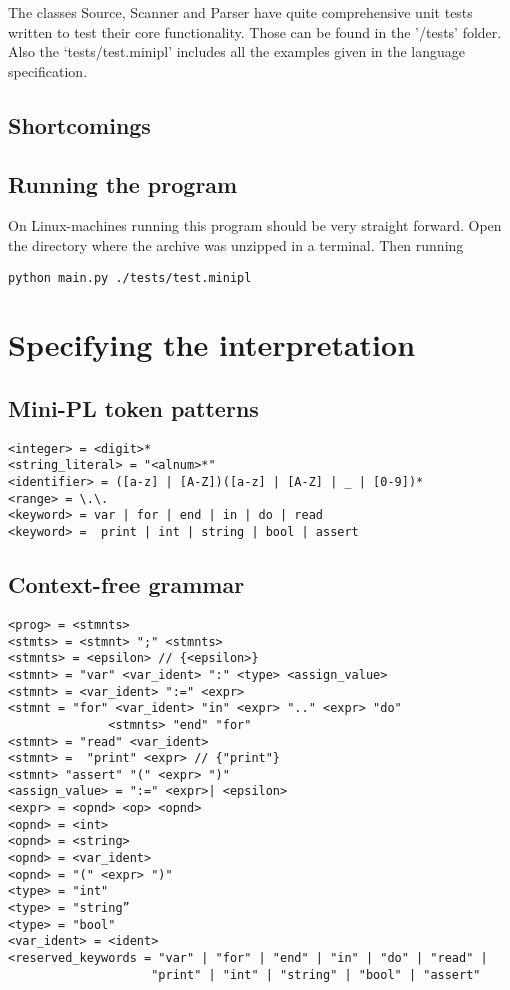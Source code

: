 \documentclass[12pt,a4paper]{article}
\begin{document}
The classes Source, Scanner and Parser have quite comprehensive
unit tests written to test their core functionality. Those
can be found in the '/tests' folder.
Also the `tests/test.minipl' includes all the examples given
in the language specification.

\subsection{Shortcomings}

\subsection{Running the program}

On Linux-machines running this program should be very straight forward.
Open the directory where the archive was unzipped in a terminal.
Then running 
\begin{lstlisting}[language=Sh]
python main.py ./tests/test.minipl
\end{lstlisting}

\section{Specifying the interpretation}

\subsection{Mini-PL token patterns}

\begin{verbatim}
<integer> = <digit>*
<string_literal> = "<alnum>*"
<identifier> = ([a-z] | [A-Z])([a-z] | [A-Z] | _ | [0-9])*
<range> = \.\.
<keyword> = var | for | end | in | do | read 
<keyword> =  print | int | string | bool | assert
\end{verbatim}

\subsection{Context-free grammar}
\begin{verbatim}
<prog> = <stmnts>
<stmts> = <stmnt> ";" <stmnts>
<stmnts> = <epsilon> // {<epsilon>}
<stmnt> = "var" <var_ident> ":" <type> <assign_value>
<stmnt> = <var_ident> ":=" <expr>
<stmnt = "for" <var_ident> "in" <expr> ".." <expr> "do"
              <stmnts> "end" "for"
<stmnt> = "read" <var_ident> 
<stmnt> =  "print" <expr> // {"print"}
<stmnt> "assert" "(" <expr> ")"
<assign_value> = ":=" <expr>| <epsilon>
<expr> = <opnd> <op> <opnd>
<opnd> = <int>
<opnd> = <string>
<opnd> = <var_ident>
<opnd> = "(" <expr> ")"
<type> = "int"
<type> = "string”
<type> = "bool"
<var_ident> = <ident>
<reserved_keywords = "var" | "for" | "end" | "in" | "do" | "read" |
                    "print" | "int" | "string" | "bool" | "assert"
\end{verbatim}
\end{document}
